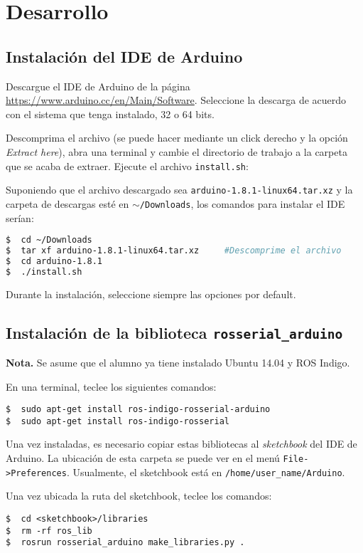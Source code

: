 \documentclass[letterpaper,12pt]{article}
\begin{document}
\section{Desarrollo}
\subsection{Instalación del IDE de Arduino}

Descargue el IDE de Arduino de la página \url{https://www.arduino.cc/en/Main/Software}. Seleccione la descarga de acuerdo con el sistema que tenga instalado, 32 o 64 bits. 

Descomprima el archivo (se puede hacer mediante un click derecho y la opción \textit{Extract here}), abra una terminal y cambie el directorio de trabajo a la carpeta que se acaba de extraer. Ejecute el archivo \texttt{install.sh}:

Suponiendo que el archivo descargado sea \texttt{arduino-1.8.1-linux64.tar.xz} y la carpeta de descargas esté en \texttt{$\sim$/Downloads}, los comandos para instalar el IDE serían:
\begin{lstlisting}[language=bash]
$  cd ~/Downloads      
$  tar xf arduino-1.8.1-linux64.tar.xz     #Descomprime el archivo
$  cd arduino-1.8.1
$  ./install.sh
\end{lstlisting}

Durante la instalación, seleccione siempre las opciones por default. 

\subsection{Instalación de la biblioteca \texttt{rosserial\_arduino}}
\textbf{Nota.} Se asume que el alumno ya tiene instalado Ubuntu 14.04 y ROS Indigo. 

En una terminal, teclee los siguientes comandos:
\begin{lstlisting}
$  sudo apt-get install ros-indigo-rosserial-arduino
$  sudo apt-get install ros-indigo-rosserial
\end{lstlisting}

Una vez instaladas, es necesario copiar estas bibliotecas al \textit{sketchbook} del IDE de Arduino. La ubicación de esta carpeta se puede ver en el menú \texttt{File->Preferences}. Usualmente, el sketchbook está en \texttt{/home/user\_name/Arduino}. 

Una vez ubicada la ruta del sketchbook, teclee los comandos:
\begin{lstlisting}
$  cd <sketchbook>/libraries
$  rm -rf ros_lib
$  rosrun rosserial_arduino make_libraries.py .
\end{lstlisting}
\end{document}
